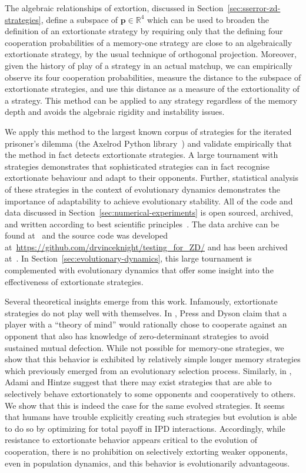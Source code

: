 \documentclass[a4paper]{article}
\begin{document}
The algebraic relationships of extortion, discussed in
Section~\ref{sec:sserror-zd-strategies}, define a subspace of
\(\textbf{p}\in\mathbb{R}^4\) which can be used to broaden the definition of an extortionate
strategy by requiring only that the defining four cooperation probabilities of a
memory-one strategy are close to an algebraically extortionate strategy, by the usual
technique of orthogonal projection. Moreover, given the history of play of a
strategy in an actual matchup, we can empirically observe its four
cooperation probabilities, measure the distance to the subspace of extortionate
strategies, and use this distance as a measure of the extortionality of a
strategy. This method can be applied to any strategy regardless of the memory
depth and avoids the algebraic rigidity and instability issues.

We apply this method to the largest known corpus of strategies for the iterated
prisoner's dilemma (the Axelrod Python library~\cite{Knight2016, Knight2018})
and validate empirically that the method in fact detects extortionate strategies.
A large tournament with 
strategies demonstrates that sophisticated
strategies can in fact recognise extortionate behaviour and adapt to their
opponents. Further, statistical analysis of these strategies in the context of
evolutionary dynamics demonstrates the importance of adaptability to achieve
evolutionary stability. All of the code and data discussed in
Section~\ref{sec:numerical-experiments} is open sourced, archived, and written
according to best scientific principles~\cite{Wilson2014}. The data archive can
be found at~\cite{vincent_knight_2018_1297075} and the source code was developed
at~\url{https://github.com/drvinceknight/testing_for_ZD/} and has been archived
at~\cite{vincent_knight_2019_2598534}. In
Section~\ref{sec:evolutionary-dynamics}, this large tournament is complemented
with evolutionary dynamics that offer some insight into the
effectiveness of extortionate strategies.

Several theoretical insights emerge from this work. Infamously, extortionate
strategies do not play well with themselves. In \cite{Press2012},
Press and Dyson claim that a player with a ``theory of mind'' would
rationally chose to cooperate against an opponent that also has knowledge
of zero-determinant strategies to avoid sustained mutual defection. While not
possible for memory-one strategies, we show that this behavior is exhibited by
relatively simple longer memory strategies which previously emerged from an
evolutionary selection process. Similarly, in
\cite{adami2013evolutionary}, Adami and Hintze suggest that there may exist
strategies that are able to selectively behave extortionately to some opponents
and cooperatively to others. We show that this is indeed the case for the same
evolved strategies. It seems that humans have trouble explicitly creating such
strategies but evolution is able to do so by optimizing for total payoff in IPD
interactions. Accordingly, while resistance to extortionate behavior appears
critical to the evolution of cooperation, there is no prohibition on selectively
extorting weaker opponents, even in population dynamics, and this behavior is
evolutionarily advantageous.
\end{document}

